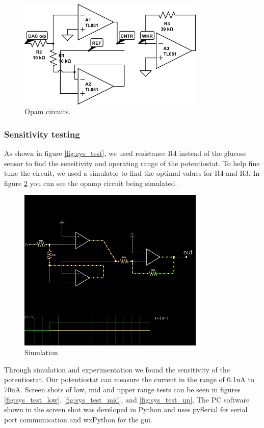 \begin{figure} 
\begin{center}
\includegraphics[width=3.5in]{../figures/opamps.png}
\end{center}
\caption{Opam circuits.}
\label{fig:opamps}
\end{figure}


\subsubsection{Sensitivity testing}
As shown in figure \ref{fig:sys_test}, we used resistance R4 instead of the glucose sensor to find the sensitivity and operating range of the potentiostat. To help fine tune the circuit, we used a simulator to find the optimal values for R4 and R3. In figure \ref{fig:sim} you can see the opamp circuit being simulated.

\begin{figure} 
\begin{center}
\includegraphics[width=3.5in]{../figures/circuit_simulator.png}
\end{center}
\caption{Simulation}
\label{fig:sim}
\end{figure}

Through simulation and experimentation we found the sensitivity of the potentiostat. Our potentiostat can measure the current in the range of 0.1uA to 70uA. Screen shots of low, mid and upper range tests can be seen in figures \ref{fig:sys_test_low}, \ref{fig:sys_test_mid}, and \ref{fig:sys_test_up}. The PC software  shown in the screen shot was developed in Python and uses pySerial for serial port communication and wxPython for the gui.

